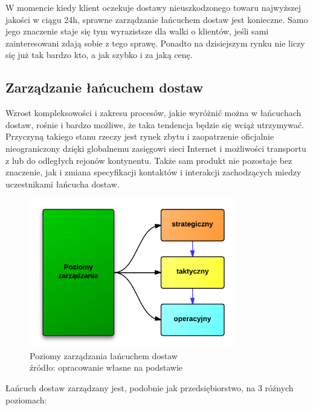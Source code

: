 		W momencie kiedy klient oczekuje dostawy nieuszkodzonego 
		towaru najwyższej jakości w ciągu 24h, sprawne zarządzanie 
		łańcuchem dostaw jest konieczne. Samo jego znaczenie staje
		się tym wyrazistsze dla walki o klientów, jeśli sami zainteresowani
		zdają sobie z tego sprawę. Ponadto na dzisiejszym rynku nie liczy się
		już tak bardzo kto, a jak szybko i za jaką cenę.
		
	\subsection{Zarządzanie łańcuchem dostaw}
		Wzrost kompleksowości i zakresu procesów, jakie wyróżnić można
		w łańcuchach dostaw, rośnie i bardzo możliwe, że taka tendencja będzie
		się wciąż utrzymywać. Przyczyną takiego stanu rzeczy jest rynek zbytu
		i zaopatrzenie oficjalnie nieograniczony dzięki globalnemu zasięgowi
		sieci Internet i możliwości transportu z lub do odległych rejonów kontynentu.
		Także sam produkt nie pozostaje bez znaczenie, jak i zmiana specyfikacji kontaktów
		i interakcji zachodzących miedzy uczestnikami łańcucha dostaw.
		\begin{figure}[H]
			\centering
			\includegraphics[width=0.8\textwidth]{images/3LevelsScm}
			\caption[Poziomy zarządzania łańcuchem dostaw]{
				Poziomy zarządzania łańcuchem dostaw\\
				źródło: opracowanie własne na podstawie \cite{ewolucja_lancuchow_dostaw_cz1}
			}
			\label{fig:3_levels_of_supply_chain}
		\end{figure}
		Łańcuch dostaw zarządzany jest, podobnie jak przedsiębiorstwo, na 3 różnych poziomach:
